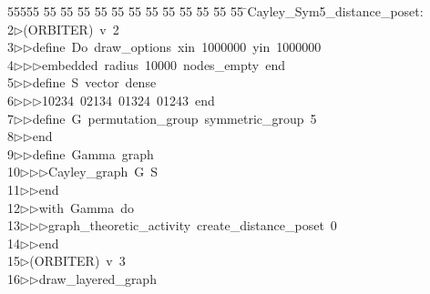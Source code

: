 %
%
\begin{tabbing}
55555 \= 55 \= 55 \= 55 \= 55 \= 55 \= 55 \= 55 \= 55 \= 55 \= 55 \= 55 \= 55 \= \>Cayley\_Sym5\_distance\_poset:\\[0pt]
2\>$\triangleright$\>(ORBITER)\ v\ 2\ \\[0pt]
3\>$\triangleright$\>$\triangleright$\>define\ Do\ draw\_options\ xin\ 1000000\ yin\ 1000000\ \\[0pt]
4\>$\triangleright$\>$\triangleright$\>$\triangleright$\>embedded\ radius\ 10000\ nodes\_empty\ end\ \\[0pt]
5\>$\triangleright$\>$\triangleright$\>define\ S\ vector\ dense\ \\[0pt]
6\>$\triangleright$\>$\triangleright$\>$\triangleright$\>10234\ 02134\ 01324\ 01243\ end\ \\[0pt]
7\>$\triangleright$\>$\triangleright$\>define\ G\ permutation\_group\ symmetric\_group\ 5\ \\[0pt]
8\>$\triangleright$\>$\triangleright$\>end\ \\[0pt]
9\>$\triangleright$\>$\triangleright$\>define\ Gamma\ graph\ \\[0pt]
10\>$\triangleright$\>$\triangleright$\>$\triangleright$\>Cayley\_graph\ G\ S\ \\[0pt]
11\>$\triangleright$\>$\triangleright$\>end\ \\[0pt]
12\>$\triangleright$\>$\triangleright$\>with\ Gamma\ do\ \\[0pt]
13\>$\triangleright$\>$\triangleright$\>$\triangleright$\>graph\_theoretic\_activity\ create\_distance\_poset\ 0\ \\[0pt]
14\>$\triangleright$\>$\triangleright$\>end\\[0pt]
15\>$\triangleright$\>(ORBITER)\ v\ 3\ \\[0pt]
16\>$\triangleright$\>$\triangleright$\>draw\_layered\_graph\ \\[0pt]

\end{tabbing}
